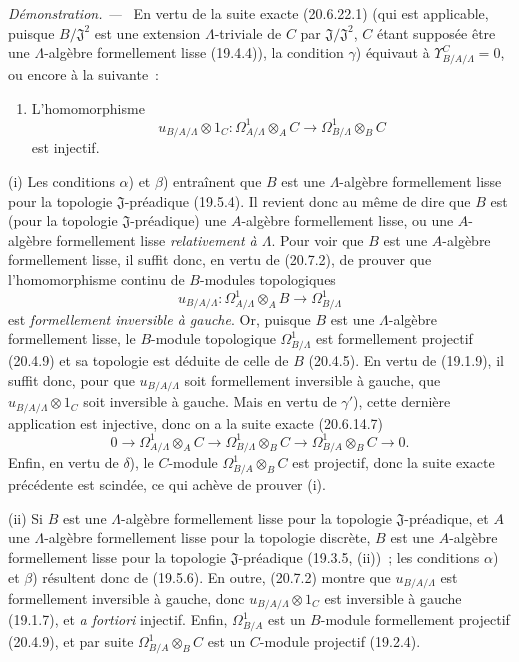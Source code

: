 \documentclass[10pt,oneside]{book}
\newcommand{\oldpage}[2][]{%
  \setcounter{footnote}{0}%
  \marginpar{\scriptsize\textbf{#1}~|~#2}\ignorespaces}
\newenvironment{proof}{%
  \par\medskip\noindent\textit{Démonstration. ---\ }}{\par}
\begin{document}
\begin{proof}
En vertu de la suite exacte (20.6.22.1) (qui est applicable, puisque
$B/\mathfrak J^2$ est une extension $\Lambda$-triviale de $C$ par
$\mathfrak J/\mathfrak J^2$, $C$ étant supposée être une $\Lambda$-algèbre
formellement lisse (19.4.4)), la condition $\gamma$) équivaut à
$\Upsilon^C_{B/A/\Lambda}=0$, ou encore à la suivante~:
\begin{enumerate}
  \item[$\gamma'$)] L'homomorphisme
  \[
    u_{B/A/\Lambda}\otimes 1_C:
    \Omega^1_{A/\Lambda}\otimes_A C
    \longrightarrow \Omega^1_{B/\Lambda}\otimes_B C
  \]
  est injectif.
\end{enumerate}

(i) Les conditions $\alpha$) et $\beta$) entraînent que $B$ est une
$\Lambda$-algèbre formellement lisse pour la topologie
$\mathfrak J$-préadique (19.5.4). Il revient donc au même de dire que $B$ est
(pour la topologie $\mathfrak J$-préadique) une $A$-algèbre formellement
lisse, ou une $A$-algèbre formellement lisse \emph{relativement à $\Lambda$}.
Pour voir que $B$ est une $A$-algèbre formellement lisse, il suffit donc, en
vertu de (20.7.2), de prouver que l'homomorphisme continu de $B$-modules
topologiques
\[
  u_{B/A/\Lambda}:\Omega^1_{A/\Lambda}\otimes_A B
  \longrightarrow\Omega^1_{B/\Lambda}
\]
est \emph{formellement inversible à gauche}. Or, puisque $B$ est une
$\Lambda$-algèbre formellement lisse, le $B$-module topologique
$\Omega^1_{B/\Lambda}$ est formellement projectif (20.4.9) et sa topologie
est déduite de celle de $B$ (20.4.5). En vertu de (19.1.9), il suffit donc,
pour que $u_{B/A/\Lambda}$ soit formellement inversible à gauche, que
$u_{B/A/\Lambda}\otimes 1_C$ soit inversible à gauche. Mais en vertu de
$\gamma'$), cette dernière application est injective, donc on a la suite
exacte (20.6.14.7)
\[
  0\longrightarrow\Omega^1_{A/\Lambda}\otimes_A C
  \longrightarrow\Omega^1_{B/\Lambda}\otimes_B C
  \longrightarrow\Omega^1_{B/A}\otimes_B C\longrightarrow0.
\]
Enfin, en vertu de $\delta$), le $C$-module
$\Omega^1_{B/A}\otimes_BC$ est projectif, donc la suite exacte précédente
est scindée, ce qui achève de prouver (i).

\oldpage[0\textsubscript{IV-1}]{184}

(ii) Si $B$ est une $\Lambda$-algèbre formellement lisse pour la topologie
$\mathfrak J$-préadique, et $A$ une $\Lambda$-algèbre formellement lisse pour
la topologie discrète, $B$ est une $A$-algèbre formellement lisse pour la
topologie $\mathfrak J$-préadique (19.3.5, (ii))~; les conditions $\alpha$) et
$\beta$) résultent donc de (19.5.6). En outre, (20.7.2) montre que
$u_{B/A/\Lambda}$ est formellement inversible à gauche, donc
$u_{B/A/\Lambda}\otimes 1_C$ est inversible à gauche (19.1.7), et \emph{a
fortiori} injectif. Enfin, $\Omega^1_{B/A}$ est un $B$-module formellement
projectif (20.4.9), et par suite $\Omega^1_{B/A}\otimes_BC$ est un $C$-module
projectif (19.2.4).
\end{proof}
\end{document}
